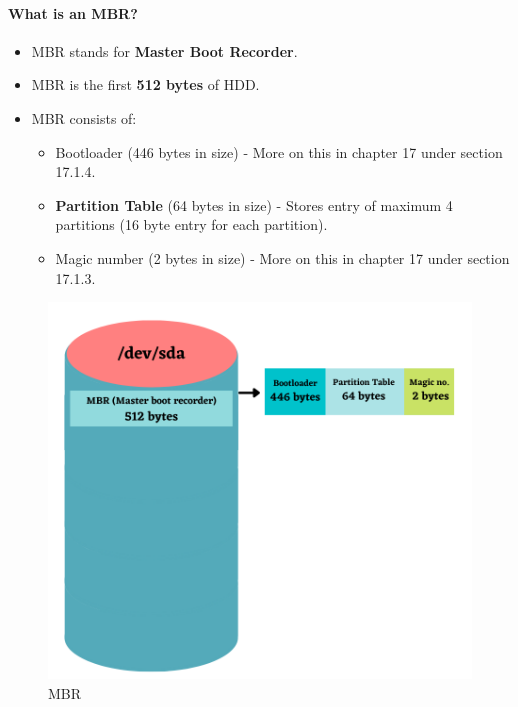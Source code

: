 \setlength{\columnsep}{3pt}
\begin{flushleft}
	
	\paragraph{What is an MBR?}
	\begin{itemize}
		\item MBR stands for \textbf{Master Boot Recorder}.
		\item MBR is the first \textbf{512 bytes} of HDD.
		\item MBR consists of:
		\begin{itemize}
			\item Bootloader (446 bytes in size) - More on this in chapter 17 under section 17.1.4.
			\item \textbf{Partition Table}  (64 bytes in size) - Stores entry of maximum 4 partitions (16 byte entry for each partition).
			\item Magic number (2 bytes in size) - More on this in chapter 17 under section 17.1.3.
		\end{itemize}
	\end{itemize}	
	 
	
		\begin{figure}[h!]
			\centering
			\includegraphics[scale=.6]{content/chapter8/images/correction3.png}
			\caption{MBR}
			\label{mbr_naming}
		\end{figure}		
	
\end{flushleft}

\newpage

